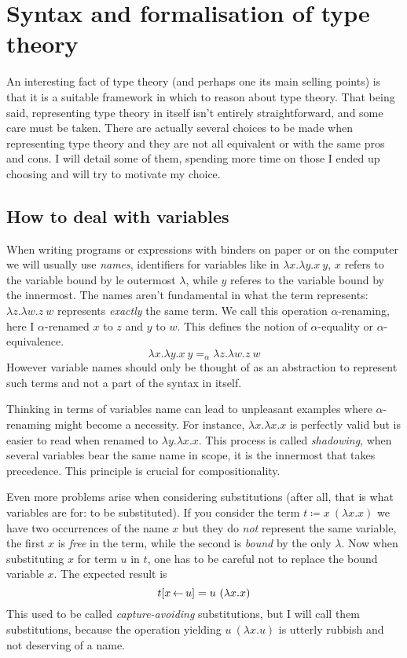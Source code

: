 \chapter{Syntax and formalisation of type theory}

An interesting fact of type theory (and perhaps one its main selling points) is
that it is a suitable framework in which to reason about type theory.
That being said, representing type theory in itself isn't entirely
straightforward, and some care must be taken. There are actually several choices
to be made when representing type theory and they are not all equivalent or with
the same pros and cons.
I will detail some of them, spending more time on those I ended up choosing
and will try to motivate my choice.

\section{How to deal with variables}

When writing programs or expressions with binders on paper or on the computer
we will usually use \emph{names}, identifiers for variables like in
\(\lambda x. \lambda y. x\ y\), \(x\) refers to the variable bound by le
outermost \(\lambda\), while \(y\) referes to the variable bound by the
innermost.
The names aren't fundamental in what the term represents:
\(\lambda z. \lambda w. z\ w\) represents \emph{exactly} the same term.
We call this operation \(\alpha\)-renaming, here I \(\alpha\)-renamed \(x\)
to \(z\) and \(y\) to \(w\). This defines the notion of \(\alpha\)-equality
or \(\alpha\)-equivalence.
\[
  \lambda x. \lambda y. x\ y =_\alpha \lambda z. \lambda w. z\ w
\]
However variable names should only be thought of as an abstraction to represent
such terms and not a part of the syntax in itself.

Thinking in terms of variables name can lead to unpleasant examples where
\(\alpha\)-renaming might become a necessity.
For instance, \(\lambda x. \lambda x. x\) is perfectly valid but is easier to
read when renamed to \(\lambda y. \lambda x. x\). This process is called
\emph{shadowing}, when several variables bear the same name in scope, it is the
innermost that takes precedence. This principle is crucial for compositionality.

Even more problems arise when considering substitutions (after all, that is what
variables are for: to be substituted).
If you consider the term \(t \coloneqq x\ (\lambda x. x)\) we have two
occurrences of the name \(x\) but they do \emph{not} represent the same
variable, the first \(x\) is \emph{free} in the term, while the second is
\emph{bound} by the only \(\lambda\).
Now when substituting \(x\) for term \(u\) in \(t\), one has to be careful not
to replace the bound variable \(x\). The expected result is
\[
  t[x \sto u] = u\ (\lambda x. x)
\]
This used to be called \emph{capture-avoiding} substitutions, but I will call
them substitutions, because the operation yielding \(u\ (\lambda x. u)\)
is utterly rubbish and not deserving of a name.


